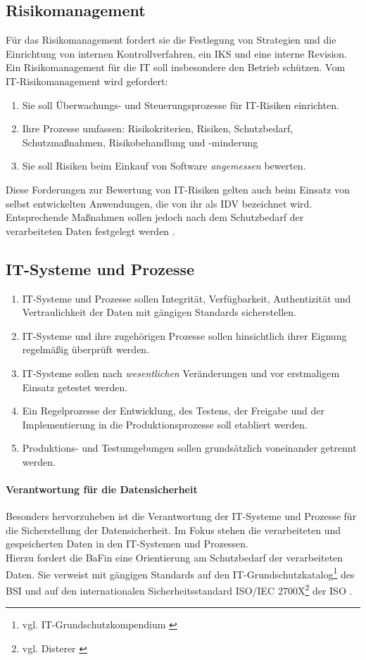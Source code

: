 \subsection{Risikomanagement}
Für das Risikomanagement fordert sie die Festlegung von Strategien und die Einrichtung von internen Kontrollverfahren, ein \ac{IKS} und eine interne Revision. Ein Risikomanagement für die IT soll insbesondere den Betrieb schützen. Vom IT-Risikomanagement wird gefordert: \cite{MaRisk:2017}
\begin{enumerate}
    \item Sie soll Überwachungs- und Steuerungsprozesse für IT-Risiken einrichten.
    \item Ihre Prozesse umfassen: Risikokriterien, Risiken, Schutzbedarf, Schutzmaßnahmen, Risikobehandlung und -minderung
    \item Sie soll Risiken beim Einkauf von Software \emph{angemessen} bewerten.
\end{enumerate}
Diese Forderungen zur Bewertung von IT-Risiken gelten auch beim Einsatz von selbst entwickelten Anwendungen, die von ihr als \ac{IDV} bezeichnet wird. Entsprechende Maßnahmen sollen jedoch nach dem Schutzbedarf der verarbeiteten Daten festgelegt werden \cite{MaRisk:2017}.

\subsection{IT-Systeme und Prozesse}
\begin{enumerate}
    \item IT-Systeme und Prozesse sollen Integrität, Verfügbarkeit, Authentizität und Vertraulichkeit der Daten mit gängigen Standards sicherstellen.
    \item IT-Systeme und ihre zugehörigen Prozesse sollen hinsichtlich ihrer Eignung regelmäßig überprüft werden.
    \item IT-Systeme sollen nach \emph{wesentlichen} Veränderungen und vor erstmaligem Einsatz getestet werden.
    \item Ein Regelprozesse der Entwicklung, des Testens, der Freigabe und der Implementierung in die Produktionsprozesse soll etabliert werden. 
    \item Produktions- und Testumgebungen sollen grundsätzlich voneinander getrennt werden.
\end{enumerate}
%
\paragraph{Verantwortung für die Datensicherheit}
Besonders hervorzuheben ist die Verantwortung der IT-Systeme und Prozesse für die Sicherstellung der Datensicherheit.  Im Fokus stehen die verarbeiteten und gespeicherten Daten in den IT-Systemen und Prozessen.
\medskip
\\
Hierzu fordert die BaFin eine Orientierung am Schutzbedarf der verarbeiteten Daten. Sie verweist mit gängigen Standards auf den IT-Grundschutzkatalog\footnote{vgl. IT-Grundschutzkompendium \cite{IT-Grundschutz:2020}} des \ac{BSI} und auf den internationalen Sicherheitsstandard ISO/IEC 2700X\footnote{vgl. Disterer \cite{Disterer2013}} der \ac{ISO} \cite{MaRisk:2017, MaRiskErläuterungen:2017}.

